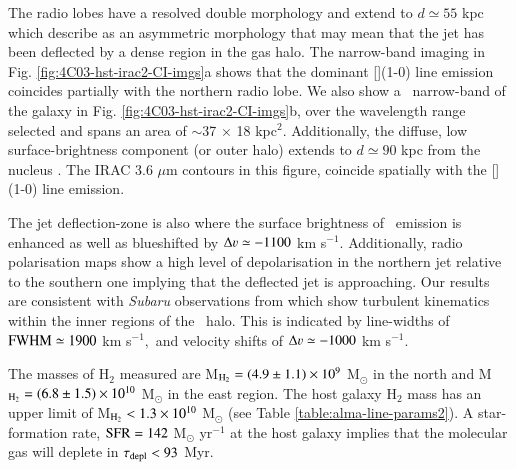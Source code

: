 The radio lobes have a resolved double morphology and extend to $d\simeq55$ kpc which \citet{vanojik1996} describe as an asymmetric morphology that may mean that the jet has been deflected by a dense region in the gas halo. The narrow-band imaging in Fig. \ref{fig:4C03-hst-irac2-CI-imgs}a shows that the dominant [](1-0) line emission coincides partially with the northern radio lobe. We also show a \lya~narrow-band of the galaxy in Fig. \ref{fig:4C03-hst-irac2-CI-imgs}b, over the wavelength range selected and spans an area of $\sim$37 $\times$ 18 kpc$^2.$ Additionally, the diffuse, low surface-brightness component (or outer halo) extends to $d\simeq90$ kpc from the nucleus \citep{Gopal-Krishna2000}. The IRAC 3.6 $\mu$m contours in this figure, coincide spatially with the [](1-0) line emission. 

The jet deflection-zone is also where the surface brightness of \lya~emission is enhanced as well as blueshifted by $\Delta \varv \simeq -1100$ km s$^{-1}.$ Additionally, radio polarisation maps show a high level of depolarisation in the northern jet relative to the southern one implying that the deflected jet is approaching. Our results are consistent with {\it Subaru} observations from \citet{Ohyama2004} which show turbulent kinematics within the inner regions of the \lya~halo. This is indicated by line-widths of $\rm FWHM \simeq 1900$ km s$^{-1},$ and velocity shifts of $\Delta \varv \simeq -1000$ km s$^{-1}.$ 

The masses of H$_2$ measured are M$_{\rm H_2} = (4.9 \pm 1.1)\times 10^{9}$ M$_\odot$ in the north and M$_{\rm H_2} = (6.8 \pm 1.5)\times 10^{10}$ M$_\odot$ in the east region. The host galaxy H$_2$ mass has an upper limit of M$_{\rm H_2} < 1.3\times 10^{10}$ M$_\odot$ (see Table \ref{table:alma-line-params2}). A star-formation rate, $\rm SFR = 142$ M$_\odot$ yr$^{-1}$ at the host galaxy implies that the molecular gas will deplete in $\tau_{\rm depl} < 93$ Myr.  

